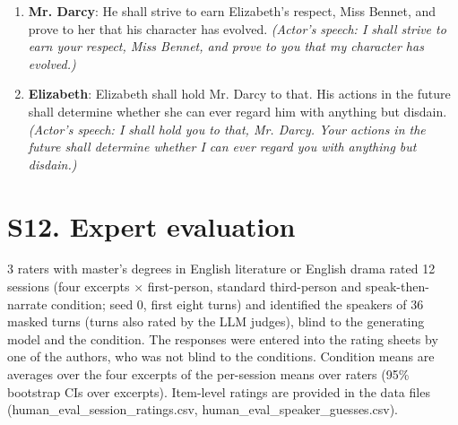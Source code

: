 \documentclass[10pt]{article}
\begin{document}
\begin{enumerate}
\item \textbf{Mr. Darcy}: He shall strive to earn Elizabeth's respect, Miss Bennet, and prove to her that his character has evolved. \emph{(Actor's speech: I shall strive to earn your respect, Miss Bennet, and prove to you that my character has evolved.)}

\item \textbf{Elizabeth}: Elizabeth shall hold Mr. Darcy to that. His actions in the future shall determine whether she can ever regard him with anything but disdain. \emph{(Actor's speech: I shall hold you to that, Mr. Darcy. Your actions in the future shall determine whether I can ever regard you with anything but disdain.)}

\end{enumerate}

\section*{S12. Expert evaluation}

3 raters with master's degrees in English literature or English drama rated 12 sessions (four excerpts $\times$ first-person, standard third-person and speak-then-narrate condition; seed 0, first eight turns) and identified the speakers of 36 masked turns (turns also rated by the LLM judges), blind to the generating model and the condition. The responses were entered into the rating sheets by one of the authors, who was not blind to the conditions. Condition means are averages over the four excerpts of the per-session means over raters (95\% bootstrap CIs over excerpts). Item-level ratings are provided in the data files (human\_eval\_session\_ratings.csv, human\_eval\_speaker\_guesses.csv).
\end{document}
